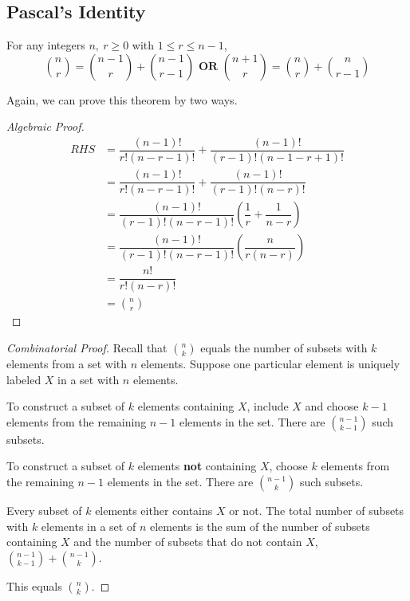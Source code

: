 \subsection{Pascal's Identity}
\begin{theorem}
	For any integers \(n,\ r \geq 0\) with \(1 \leq r \leq n-1\),
	\[
		\binom{n}{r} = \binom{n-1}{r} + \binom{n-1}{r-1} \mathbf{\text{ OR }} \binom{n+1}{r} = \binom{n}{r} + \binom{n}{r-1}
	\]  
\end{theorem}

Again, we can prove this theorem by two ways.

\begin{proof}[Algebraic Proof]
	\[
		\begin{aligned}
			RHS &= \dfrac{(n-1)!}{r!(n-r-1)!} + \dfrac{(n-1)!}{(r-1)!(n-1-r+1)!} \\
			&= \dfrac{(n-1)!}{r!(n-r-1)!} + \dfrac{(n-1)!}{(r-1)!(n-r)!} \\
			&= \dfrac{(n-1)!}{(r-1)!(n-r-1)!} \left(\dfrac{1}{r} + \dfrac{1}{n-r}\right) \\
			&= \dfrac{(n-1)!}{(r-1)!(n-r-1)!} \left(\dfrac{n}{r(n-r)}\right) \\
			&= \dfrac{n!}{r!(n-r)!} \\
			&= \binom{n}{r}
		\end{aligned}
	\]
\end{proof}

\begin{proof}[Combinatorial Proof] 
	Recall that \(\binom{n}{k}\) equals the number of subsets with \(k\) elements from a set with \(n\) elements. Suppose one particular element is uniquely labeled \(X\) in a set with \(n\) elements.
	
	To construct a subset of \(k\) elements containing \(X\), include \(X\) and choose \(k-1\) elements from the remaining \(n-1\) elements in the set. There are \(\binom{n-1}{k-1}\) such subsets.

	To construct a subset of \(k\) elements \textbf{not} containing \(X\), choose \(k\) elements from the remaining \(n-1\) elements in the set. There are \(\binom{n-1}{k}\) such subsets.

	Every subset of \(k\) elements either contains \(X\) or not. The total number of subsets with \(k\) elements in a set of \(n\) elements is the sum of the number of subsets containing \(X\) and the number of subsets that do not contain \(X\), \(\binom{n-1}{k-1} + \binom{n-1}{k}\).

	This equals \(\binom{n}{k}\).
\end{proof}
